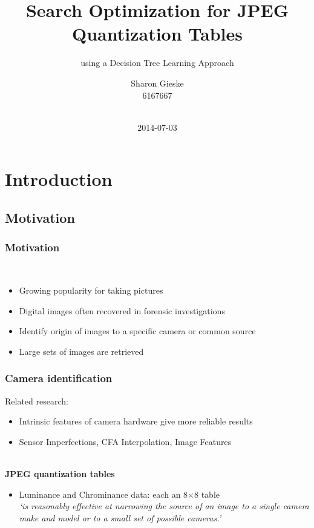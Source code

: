 \documentclass{beamer}
\title{Search Optimization for JPEG Quantization Tables}
\subtitle{using a Decision Tree Learning Approach}
\author{Sharon Gieske\\6167667\\~\\}
\institute[UvA] %
{
Supervisors: Zeno Geradts (NFI)\\~\\
Master System and Network Engineering\\
University of Amsterdam \\
}
\date{2014-07-03} %
\begin{document}


\frame{
\maketitle
}

\section[Introduction]{Introduction}

\subsection{Motivation}
\begin{frame}
\frametitle{Motivation}~\\
\begin{itemize}
\item Growing popularity for taking pictures
\item Digital images often recovered in forensic investigations
\item Identify origin of images to a specific camera or common source
\item Large sets of images are retrieved
\end{itemize}

\end{frame}

\begin{frame}
\frametitle{Camera identification}
Related research:
\begin{itemize}
\item Intrinsic features of camera hardware give more reliable results\cite{van2007survey}
\item Sensor Imperfections, CFA Interpolation, Image Features
\end{itemize} 
~\\
\textbf{JPEG quantization tables}
\begin{itemize}
\item Luminance and Chrominance data: each an 8$\times$8 table\\
\textit{`is reasonably effective at narrowing the source of an image to a single camera make and model or to
a small set of possible cameras.'}\cite{farid1}
\end{itemize}
\end{frame}
\end{document}
